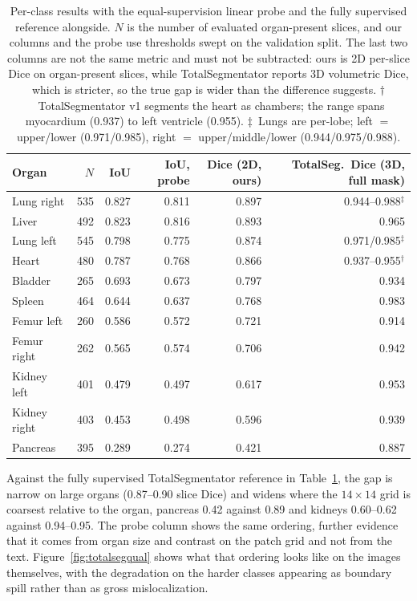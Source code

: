 \documentclass[10pt]{article}
\begin{document}
\begin{table}[!htbp]
\centering
\caption{Per-class results with the equal-supervision linear probe and the fully
supervised reference alongside. $N$ is the number of evaluated organ-present
slices, and our columns and the probe use thresholds swept on the validation split. The last two columns are not the
same metric and must not be subtracted: ours is 2D per-slice Dice on organ-present
slices, while TotalSegmentator \cite{wasserthal2023totalsegmentator} reports 3D
volumetric Dice, which is stricter, so the true gap is wider than the difference
suggests. $\dagger$~TotalSegmentator v1 segments the heart as chambers; the range
spans myocardium (0.937) to left ventricle (0.955). $\ddagger$~Lungs are
per-lobe; left $=$ upper/lower (0.971/0.985), right $=$ upper/middle/lower
(0.944/0.975/0.988).}
\label{tab:perclass}
\begin{tabular}{lrrrrr}
\toprule
Organ & $N$ & IoU & IoU, probe & Dice (2D, ours) & TotalSeg.\ Dice (3D, full mask) \\
\midrule
Lung right   & 535 & 0.827 & 0.811 & 0.897 & 0.944--0.988$^\ddagger$ \\
Liver        & 492 & 0.823 & 0.816 & 0.893 & 0.965 \\
Lung left    & 545 & 0.798 & 0.775 & 0.874 & 0.971/0.985$^\ddagger$ \\
Heart        & 480 & 0.787 & 0.768 & 0.866 & 0.937--0.955$^\dagger$ \\
Bladder      & 265 & 0.693 & 0.673 & 0.797 & 0.934 \\
Spleen       & 464 & 0.644 & 0.637 & 0.768 & 0.983 \\
Femur left   & 260 & 0.586 & 0.572 & 0.721 & 0.914 \\
Femur right  & 262 & 0.565 & 0.574 & 0.706 & 0.942 \\
Kidney left  & 401 & 0.479 & 0.497 & 0.617 & 0.953 \\
Kidney right & 403 & 0.453 & 0.498 & 0.596 & 0.939 \\
Pancreas     & 395 & 0.289 & 0.274 & 0.421 & 0.887 \\
\bottomrule
\end{tabular}
\end{table}

Against the fully supervised TotalSegmentator reference
\cite{wasserthal2023totalsegmentator} in Table~\ref{tab:perclass}, the gap is
narrow on large organs (0.87--0.90 slice Dice) and widens where the
$14\times14$ grid is coarsest relative to the organ, pancreas 0.42 against 0.89
and kidneys 0.60--0.62 against 0.94--0.95. The probe column shows the same ordering, further evidence that it comes from organ size and contrast
on the patch grid and not from the text. Figure~\ref{fig:totalsegqual}
shows what that ordering looks like on the images themselves, with the
degradation on the harder classes appearing as boundary spill rather than as
gross mislocalization.
\end{document}
